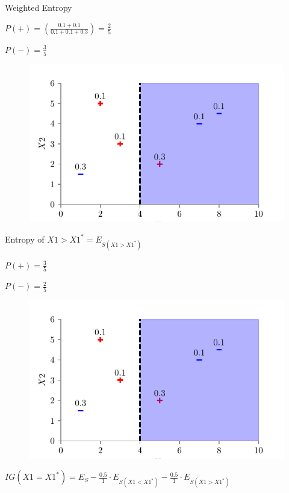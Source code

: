 \documentclass[usenames,dvipsnames]{beamer}
\begin{document}
\begin{section}{Weighted Entropy}
\begin{frame}
	\(P(+) = \left( \frac{0.1 + 0.1}{0.1 + 0.1 + 0.3} \right) = \frac{2}{5}\)
	
	\(P(-) = \frac{3}{5}\)
	
	
	\end{frame}
	
	
	\begin{frame}
	
	\begin{figure}
		\centering
		\includegraphics{../assets/decision-trees/figures/dt_weighted/fig5.pdf}
	\end{figure}
	Entropy of \(X1  > X1^*  = E_{S(X1 > X1^*)}\)
	
	\(P(+) = \frac{3}{5}\)
	
	\(P(-) = \frac{2}{5}\)
	
	\end{frame}
	
	
	
	\begin{frame}
	
	\begin{figure}
		\centering
		\includegraphics{../assets/decision-trees/figures/dt_weighted/fig5.pdf}
	\end{figure}
	
	\( IG(X1 = X1^* ) = E_S - \frac{0.5}{1} \cdot E_{S(X1 < X1^*)}  - \frac{0.5}{1} \cdot E_{S(X1 > X1^*)}\)
	
	\end{frame}

\end{section}
\end{document}
